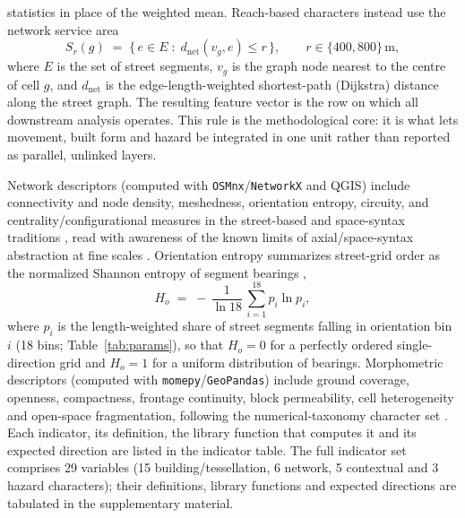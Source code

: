 statistics in place of the weighted mean. Reach-based characters instead use the
network service area
\begin{equation}\label{eq:servicearea}
S_{r}(g) \;=\; \{\, e \in E \;:\; d_{\mathrm{net}}(v_{g}, e) \le r \,\},
\qquad r \in \{400, 800\}\,\mathrm{m},
\end{equation}
where $E$ is the set of street segments, $v_{g}$ is the graph node nearest to
the centre of cell $g$, and $d_{\mathrm{net}}$ is the edge-length-weighted
shortest-path (Dijkstra) distance along the street graph. The resulting feature
vector is the row on which all downstream analysis operates.
This rule is the methodological core: it is what lets movement, built form and
hazard be integrated in one unit rather than reported as parallel, unlinked
layers.

\label{sec:methods-indicators}
Network descriptors (computed with \texttt{OSMnx}/\texttt{NetworkX} and QGIS)
include connectivity and node density, meshedness, orientation entropy, circuity,
and centrality/configurational measures in the street-based and space-syntax
traditions \citep{porta2012StreetCentrali, araldi2019FromStreet,
boeing2022StreetNetwork, hillier1984SocialLogic}, read with awareness of the
known limits of axial/space-syntax abstraction at fine scales
\citep{pafka2020LimitsSpace}. Orientation entropy summarizes street-grid order as
the normalized Shannon entropy of segment bearings \citep{boeing2019UrbanSpatial},
\begin{equation}\label{eq:orient}
H_{o} \;=\; -\,\frac{1}{\ln 18}\,\sum_{i=1}^{18} p_{i} \ln p_{i},
\end{equation}
where $p_{i}$ is the length-weighted share of street segments falling in
orientation bin $i$ (18 bins; Table~\ref{tab:params}), so that $H_{o}=0$ for a
perfectly ordered single-direction grid and $H_{o}=1$ for a uniform distribution
of bearings. Morphometric descriptors (computed with
\texttt{momepy}/\texttt{GeoPandas}) include ground coverage, openness, compactness,
frontage continuity, block permeability, cell heterogeneity and open-space
fragmentation, following the numerical-taxonomy character set
\citep{fleischmann2021MeasurinUrban, fleischmann2022MethodolFoundati}. Each
indicator, its definition, the library function that computes it and its expected
direction are listed in the indicator table. The full indicator set comprises 29
variables (15 building/tessellation, 6 network, 5 contextual and 3 hazard
characters); their definitions, library functions and expected directions are
tabulated in the supplementary material.


